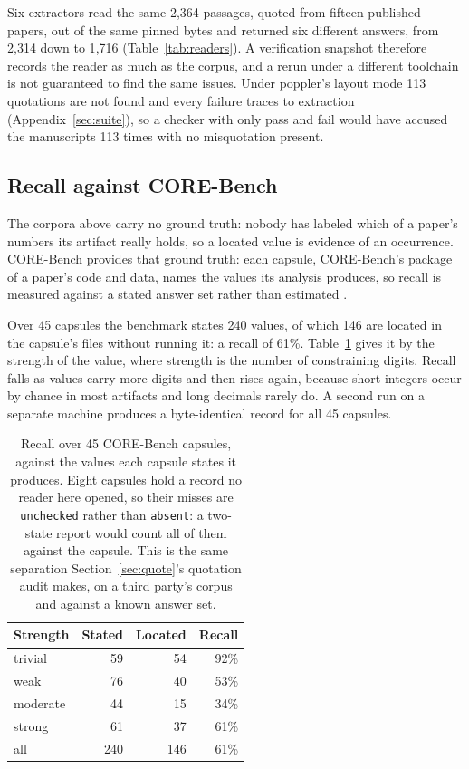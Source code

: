 \documentclass{article}
\newcommand{\code}[1]{\texttt{#1}}
\begin{document}
Six extractors read the same 2{,}364 passages, quoted from fifteen published papers, out of the same pinned bytes and returned six
different answers, from 2{,}314 down to 1{,}716 (Table~\ref{tab:readers}). A verification snapshot therefore records the
reader as much as the corpus, and a rerun under a different toolchain is not guaranteed to find
the same issues. Under poppler's layout mode 113 quotations are not found and every failure
traces to extraction (Appendix~\ref{sec:suite}), so a checker with only pass and fail would have
accused the manuscripts 113 times with no misquotation present.

\subsection{Recall against CORE-Bench}

The corpora above carry no ground truth: nobody has labeled which of a paper's numbers its
artifact really holds, so a located value is evidence of an occurrence. CORE-Bench provides that ground truth: each capsule, CORE-Bench's package of a paper's code and
data, names the values its analysis produces, so recall is measured against a stated answer set
rather than estimated \citep{siegel2024corebench}.

Over 45 capsules the benchmark states 240 values, of which 146 are located in the capsule's files
without running it: a recall of 61\%. Table~\ref{tab:recall} gives it by the strength of the value, where strength is the
number of constraining digits. Recall falls as values carry more digits and then rises again,
because short integers occur by chance in most artifacts and long decimals rarely do.
A second run on a separate machine produces a byte-identical record for all 45 capsules.

\begin{table}[h]
\centering
\small
\caption{Recall over 45 CORE-Bench capsules, against the values each capsule states it
produces. Eight capsules hold a record no reader here opened, so their misses are
\code{unchecked} rather than \code{absent}: a two-state report would count all of them against
the capsule. This is the same separation Section~\ref{sec:quote}'s quotation audit makes, on a
third party's corpus and against a known answer set.}
\label{tab:recall}
\begin{tabular}{@{}lrrr@{}}
\toprule
\textbf{Strength} & \textbf{Stated} & \textbf{Located} & \textbf{Recall} \\
\midrule
trivial & 59 & 54 & 92\% \\
weak & 76 & 40 & 53\% \\
moderate & 44 & 15 & 34\% \\
strong & 61 & 37 & 61\% \\
\midrule
all & 240 & 146 & 61\% \\
\bottomrule
\end{tabular}
\end{table}
\end{document}

